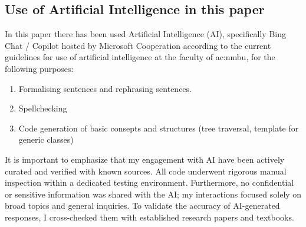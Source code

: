 \subsection[Use of AI]{Use of Artificial Intelligence in this paper}

In this paper there has been used Artificial Intelligence (AI), specifically Bing Chat / Copilot hosted by Microsoft Cooperation according to the current guidelines for use of artificial intelligence at the faculty of \acrfull{ac:nmbu}, for the following purposes:

\begin{enumerate}
	\item Formalising sentences and rephrasing sentences.
	\item Spellchecking
	\item Code generation of basic consepts and structures (tree traversal, template for generic classes) 
\end{enumerate}

It is important to emphasize that my engagement with AI have been actively curated and verified with known sources. All code underwent rigorous manual inspection within a dedicated testing environment. Furthermore, no confidential or sensitive information was shared with the AI; my interactions focused solely on broad topics and general inquiries. To validate the accuracy of AI-generated responses, I cross-checked them with established research papers and textbooks.
